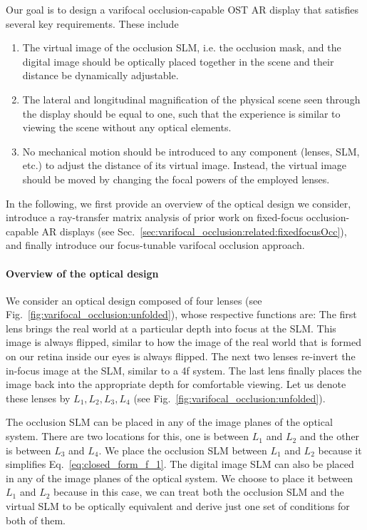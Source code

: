 
Our goal is to design a varifocal occlusion-capable OST AR display that satisfies several key requirements. These include 
%
\begin{enumerate}
    \item The virtual image of the occlusion SLM, i.e. the occlusion mask, and the digital image should be optically placed together in the scene and their distance be dynamically adjustable.
    \item The lateral and longitudinal magnification of the physical scene seen through the display should be equal to one, such that the experience is similar to viewing the scene without any optical elements.
    \item No mechanical motion should be introduced to any component (lenses, SLM, etc.) to adjust the distance of its virtual image. Instead, the virtual image should be moved by changing the focal powers of the employed lenses.
\end{enumerate}
%

In the following, we first provide an overview of the optical design we consider, introduce a ray-transfer matrix analysis of prior work on fixed-focus occlusion-capable AR displays (see Sec.~\ref{sec:varifocal_occlusion:related:fixedfocusOcc}), and  finally introduce our focus-tunable varifocal occlusion approach.

\paragraph{\textbf{Overview of the optical design}}
We consider an optical design composed of four lenses (see Fig.~\ref{fig:varifocal_occlusion:unfolded}), whose respective functions are: The first lens brings the real world at a particular depth into focus at the SLM. This image is always flipped, similar to how the image of the real world that is formed on our retina inside our eyes is always flipped. The next two lenses re-invert the in-focus image at the SLM, similar to a 4f system. The last lens finally places the image back into the appropriate depth for comfortable viewing. Let us denote these lenses by $L_1,L_2,L_3,L_4$ (see Fig.~\ref{fig:varifocal_occlusion:unfolded}).

The occlusion SLM can be placed in any of the image planes of the optical system. There are two locations for this, one is between $L_1$ and $L_2$ and the other is between $L_3$ and $L_4$. We place the occlusion SLM between $L_1$ and $L_2$ because it simplifies Eq.~\eqref{eq:closed_form_f_1}. The digital image SLM can also be placed in any of the image planes of the optical system. We choose to place it between $L_1$ and $L_2$ because in this case, we can treat both the occlusion SLM and the virtual SLM to be optically equivalent and derive just one set of conditions for both of them.

